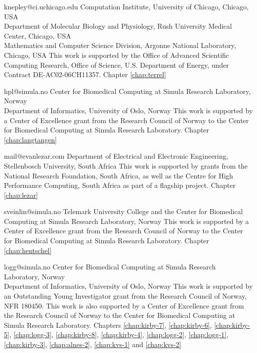              {knepley@ci.uchicago.edu}
             {Computation Institute, University of Chicago, Chicago, USA \\
              Department of Molecular Biology and Physiology, Rush University Medical Center, Chicago, USA \\
              Mathematics and Computer Science Division, Argonne National Laboratory, Chicago, USA}
             {This work is supported by the Office of Advanced Scientific Computing
              Research, Office of Science, U.S. Department of Energy, under Contract DE-AC02-06CH11357.}
             {Chapter \ref{chap:terrel}}

             {hpl@simula.no}
             {Center for Biomedical Computing at Simula Research Laboratory, Norway \\
              Department of Informatics, University of Oslo, Norway}
             {This work is supported by a Center of Excellence
              grant from the Research Council of Norway to the Center
              for Biomedical Computing at Simula Research
              Laboratory.}
             {Chapter \ref{chap:langtangen}}

             {mail@evanlezar.com}
             {Department of Electrical and Electronic Engineering, Stellenbosch University, South Africa}
             {This work is supported by grants from the National Research
              Foundation, South Africa, as well as the Centre for High Performance
              Computing, South Africa as part of a flagship project.}
             {Chapter \ref{chap:lezar}}

             {sveinlin@simula.no}
             {Telemark University College and the Center for Biomedical Computing at Simula Research Laboratory, Norway}
             {This work is supported by a Center of Excellence
              grant from the Research Council of Norway to the Center
              for Biomedical Computing at Simula Research
              Laboratory.}
             {Chapter \ref{chap:hentschel}}

             {logg@simula.no}
             {Center for Biomedical Computing at Simula Research Laboratory, Norway \\
              Department of Informatics, University of Oslo, Norway}
             {This work is supported by an Outstanding Young
              Investigator grant from the Research Council of Norway,
              NFR 180450. This work is also supported by a Center of
              Excellence grant from the Research Council of Norway to
              the Center for Biomedical Computing at Simula Research
              Laboratory.}
             {Chapters
              \ref{chap:kirby-7},
              \ref{chap:kirby-6},
              \ref{chap:kirby-5},
              \ref{chap:logg-3},
              \ref{chap:kirby-8},
              \ref{chap:kirby-4},
              \ref{chap:logg-2},
              \ref{chap:logg-1},
              \ref{chap:kirby-3},
              \ref{chap:alnes-2},
              \ref{chap:kvs-1} and
              \ref{chap:kvs-2}}

